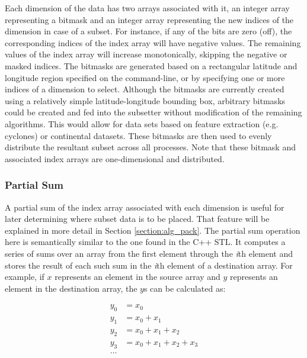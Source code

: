 Each dimension of the data has two arrays associated with it, an integer array
representing a bitmask and an integer array representing the new indices of
the dimension in case of a subset.  For instance, if any of the bits are zero
(off), the corresponding indices of the index array will have negative values.
The remaining values of the index array will increase monotonically, skipping
the negative or masked indices.  The bitmasks are generated based on a
rectangular latitude and longitude region specified on the command-line, or by
specifying one or more indices of a dimension to select. Although the bitmasks
are currently created using a relatively simple latitude-longitude bounding
box, arbitrary bitmasks could be created and fed into the subsetter without
modification of the remaining algorithms. This would allow for data sets based
on feature extraction (e.g. cyclones) or continental datasets.  These bitmasks
are then used to evenly distribute the resultant subset across all processes.
Note that these bitmask and associated index arrays are one-dimensional and
distributed.

\subsubsection{Partial Sum}


A partial sum of the index array associated with each dimension is useful for
later determining where subset data is to be placed.  That feature will be
explained in more detail in Section \ref{section:alg_pack}.  The partial sum
operation here is semantically similar to the one found in the C++
STL\cite{CXXSTL}.  It computes a series of sums over an array from the first
element through the \emph{i}th element and stores the result of each such sum
in the \emph{i}th element of a destination array.  For example, if $x$
represents an element in the source array and $y$ represents an element in the
destination array, the $y$s can be calculated as:

\begin{equation}
\begin{split}
y_0 &= x_0\\
y_1 &= x_0 + x_1\\
y_2 &= x_0 + x_1 + x_2\\
y_3 &= x_0 + x_1 + x_2 + x_3\\
\ldots
\end{split}
\end{equation}

